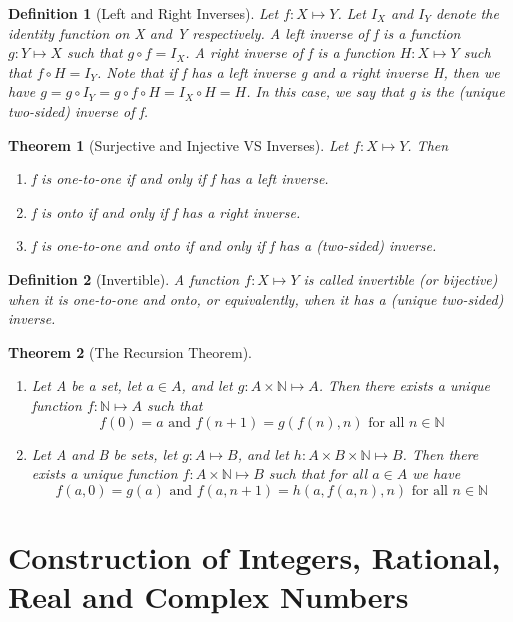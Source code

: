 \documentclass[11pt, oneside]{book}
\theoremstyle{break}
\newtheorem{thm}{Theorem}[section]
\newtheorem{defn}{Definition}[section]
\newcommand{\bb}[1]{\mathbb{#1}}		%
\begin{document}
\begin{defn}[Left and Right Inverses]
	Let $f: X \mapsto Y$. Let $I_X$ and $I_Y$ denote the identity function on X and Y respectively. A left inverse of f is a function $g: Y \mapsto X$ such that $g \circ f = I_X$. A right inverse of f is a function $H: X \mapsto Y$ such that $f \circ H = I_Y$. Note that if f has a left inverse g and a right inverse H, then we have $g = g \circ I_Y = g \circ f \circ H = I_X \circ H = H$. In this case, we say that g is the (unique two-sided) inverse of f.
\end{defn}

\begin{thm}[Surjective and Injective VS Inverses]
	Let $f: X \mapsto Y$. Then
	\begin{enumerate}
		\item f is one-to-one if and only if f has a left inverse.
		\item f is onto if and only if f has a right inverse.
		\item f is one-to-one and onto if and only if f has a (two-sided) inverse.
	\end{enumerate}
\end{thm}

\begin{defn}[Invertible]
	A function $f: X \mapsto Y$ is called invertible (or bijective) when it is one-to-one and onto, or equivalently, when it has a (unique two-sided) inverse.
\end{defn}

\begin{thm}[The Recursion Theorem]\label{recursion_theorem}
	\begin{enumerate}
		\item Let A be a set, let $a \in A$, and let $g : A \times \bb{N} \mapsto A$. Then there exists a unique function $f: \bb{N} \mapsto A$ such that
		\[
			f(0) = a \text{ and } f(n+1) = g(f(n), n) \text{ for all } n \in \bb{N}
		\]
		\item Let A and B be sets, let $g: A \mapsto B$, and let $h: A \times B \times \bb{N} \mapsto B$. Then there exists a unique function $f:A \times \bb{N} \mapsto B$ such that for all $a \in A$ we have
		\[
			f(a, 0) = g(a) \text{ and } f(a, n + 1) = h(a, f(a, n), n) \text{ for all } n \in \bb{N}
		\]
	\end{enumerate}
\end{thm}


\section{Construction of Integers, Rational, Real and Complex Numbers}
\end{document}

